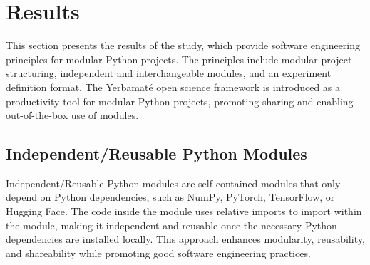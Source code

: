 \section{Results}

This section presents the results of the study, which provide software engineering principles for modular Python projects. The principles include modular project structuring, independent and interchangeable modules, and an experiment definition format. The Yerbamaté open science framework is introduced as a productivity tool for modular Python projects, promoting sharing and enabling out-of-the-box use of modules.

\subsection{Independent/Reusable Python Modules}

Independent/Reusable Python modules are self-contained modules that only depend on Python dependencies, such as NumPy, PyTorch, TensorFlow, or Hugging Face. The code inside the module uses relative imports to import within the module, making it independent and reusable once the necessary Python dependencies are installed locally. This approach enhances modularity, reusability, and shareability while promoting good software engineering practices.




